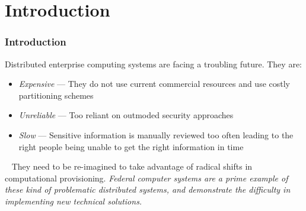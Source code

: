 \section{Introduction}
\begin{frame}
\frametitle{Introduction}
Distributed enterprise computing systems are facing a troubling future.  They are:
\pause
\begin{itemize}
\item \textit{Expensive} --- They do not use current commercial resources and use costly partitioning schemes
\pause
\item \textit{Unreliable} --- Too reliant on outmoded security approaches
\pause
\item \textit{Slow} --- Sensitive information is manually reviewed too often leading to the right people being unable to get the right information in time 
\end{itemize}
\
\newline
\pause
They need to be re-imagined to take advantage of radical shifts in computational provisioning.
\newline
\newline
\pause
\textit{Federal computer systems are a prime example of these kind of problematic distributed systems, and demonstrate the difficulty in implementing new technical solutions.}
\end{frame}